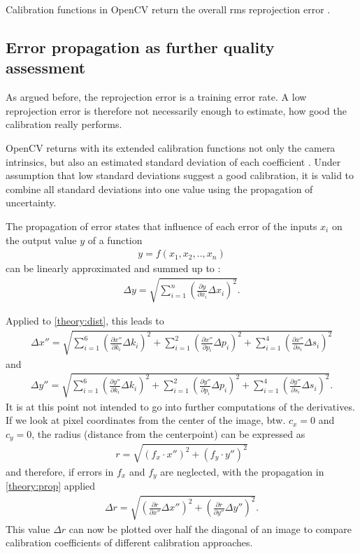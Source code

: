Calibration functions in OpenCV return the overall \acs{rms} reprojection error \cite{cv_calib}.

\subsection{Error propagation as further quality assessment}
As argued before, the reprojection error is a training error rate.
A low reprojection error is therefore not necessarily enough to estimate, how good the calibration really performs.

OpenCV returns with its extended calibration functions not only the camera intrinsics, but also an estimated standard deviation of each coefficient \cite{cv_calib}.
Under assumption that low standard deviations suggest a good calibration, it is valid to combine all standard deviations into one value using the propagation of uncertainty.

The propagation of error states that influence of each error of the inputs $x_i$ on the output value $y$ of a function
\begin{align*}
	y = f(x_1, x_2,..,x_n)
\end{align*}
can be linearly approximated and summed up to \cite{benno}:
\begin{align}
	\Delta y = \sqrt{\sum_{i=1}^{n}\left(\frac{\partial y}{\partial x_i}\Delta x_i \right)^2} \label{theory:prop}.
\end{align}

Applied to \ref{theory:dist}, this leads to
\begin{align*}
	\Delta x''=\sqrt{\sum_{i=1}^{6}\left(\frac{\partial x''}{\partial k_i}\Delta k_i \right)^2+\sum_{i=1}^{2}\left( \frac{\partial x''}{\partial p_i}\Delta p_i\right)^2+\sum_{i=1}^{4}\left( \frac{\partial x''}{\partial s_i}\Delta s_i\right)^2}
\end{align*}
and
\begin{align*}
	\Delta y''=\sqrt{\sum_{i=1}^{6}\left(\frac{\partial y''}{\partial k_i}\Delta k_i \right)^2+\sum_{i=1}^{2}\left( \frac{\partial y''}{\partial p_i}\Delta p_i\right)^2+\sum_{i=1}^{4}\left( \frac{\partial y''}{\partial s_i}\Delta s_i\right)^2}.
\end{align*}
It is at this point not intended to go into further computations of the derivatives.
If we look at pixel coordinates from the center of the image, btw. $c_x=0$ and $c_y=0$, the radius (distance from the centerpoint) can be expressed as
\begin{align*}
	r = \sqrt{(f_x\cdot x'')^2+(f_y\cdot y'')^2}
\end{align*}
and therefore, if errors in $f_x$ and $f_y$ are neglected, with the propagation in \ref{theory:prop} applied
\begin{align}
	\Delta r = \sqrt{\left(\frac{\partial r}{\partial x''} \Delta x''\right)^2+\left(\frac{\partial r}{\partial y''} \Delta y''\right)^2}\label{theory:delta_r}.
\end{align}
This value $\Delta r$ can now be plotted over half the diagonal of an image to compare calibration coefficients of different calibration approaches.
